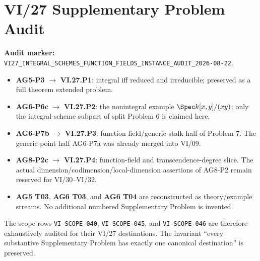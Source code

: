 \chapter*{VI/27 Supplementary Problem Audit}
\label{audit:vi27}
\textbf{Audit marker:} \texttt{VI27\_INTEGRAL\_SCHEMES\_FUNCTION\_FIELDS\_INSTANCE\_AUDIT\_2026-08-22}.

\begin{itemize}
\item \textbf{AG5-P3} $\to$ \textbf{VI.27.P1}: integral iff reduced and irreducible; preserved as a full theorem extended problem.
\item \textbf{AG6-P6c} $\to$ \textbf{VI.27.P2}: the nonintegral example $\Spec k[x,y]/(xy)$; only the integral-scheme subpart of split Problem 6 is claimed here.
\item \textbf{AG6-P7b} $\to$ \textbf{VI.27.P3}: function field/generic-stalk half of Problem 7.  The generic-point half AG6-P7a was already merged into VI/09.
\item \textbf{AG8-P2c} $\to$ \textbf{VI.27.P4}: function-field and transcendence-degree slice.  The actual dimension/codimension/local-dimension assertions of AG8-P2 remain reserved for VI/30--VI/32.
\item \textbf{AG5 T03}, \textbf{AG6 T03}, and \textbf{AG6 T04} are reconstructed as theory/example streams.  No additional numbered Supplementary Problem is invented.
\end{itemize}

The scope rows \texttt{VI-SCOPE-040}, \texttt{VI-SCOPE-045}, and \texttt{VI-SCOPE-046} are therefore exhaustively audited for their VI/27 destinations.  The invariant ``every substantive Supplementary Problem has exactly one canonical destination'' is preserved.
